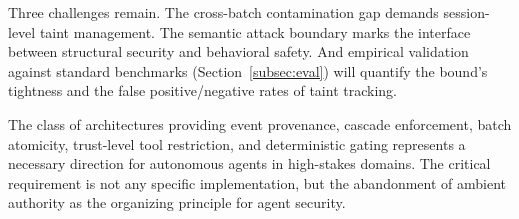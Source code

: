 \documentclass[pdflatex,sn-nature]{sn-jnl}%
\theoremstyle{thmstyleone}%
\theoremstyle{thmstyletwo}%
\theoremstyle{thmstylethree}%
\begin{document}
Three challenges remain. The cross-batch contamination gap demands session-level taint management. The semantic attack boundary marks the interface between structural security and behavioral safety. And empirical validation against standard benchmarks (Section~\ref{subsec:eval}) will quantify the bound's tightness and the false positive/negative rates of taint tracking.

The class of architectures providing event provenance, cascade enforcement, batch atomicity, trust-level tool restriction, and deterministic gating represents a necessary direction for autonomous agents in high-stakes domains. The critical requirement is not any specific implementation, but the abandonment of ambient authority as the organizing principle for agent security.


\end{document}
